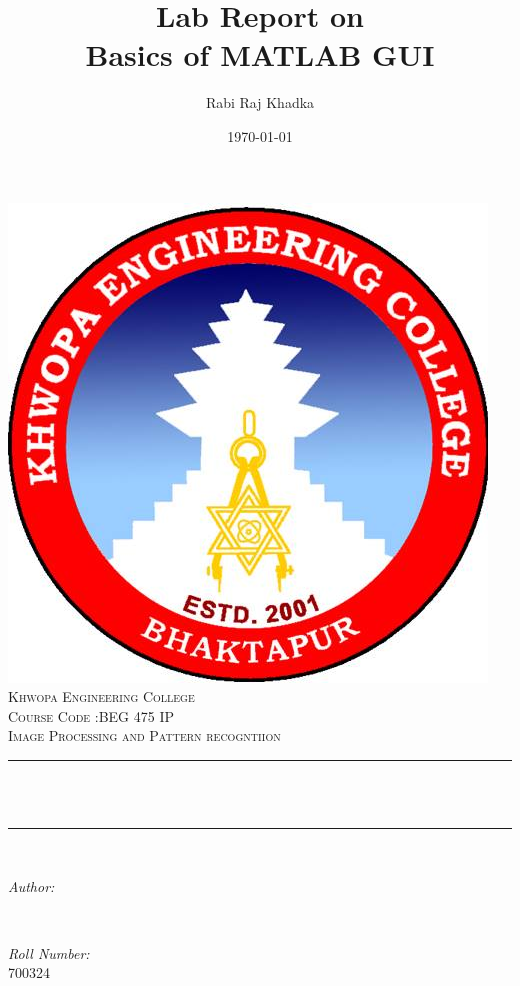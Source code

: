 \documentclass[12pt]{article}
\title{Lab Report on \\ Basics of MATLAB GUI}			%
\author{Rabi Raj Khadka}								%
\date{\today}											%
\makeatletter
\let\thetitle\@title
\let\theauthor\@author
\let\thedate\@date
\makeatother
\begin{document}

\begin{titlepage}
	\centering
    \includegraphics[scale = 0.3]{kheclogo.jpg}\\[1.0 cm]	%
    \textsc{\LARGE Khwopa Engineering College}\\[2.0 cm]	%
	\textsc{\Large Course Code :BEG 475 IP}\\[0.5 cm]				%
	\textsc{\large Image Processing and Pattern recogntiion}\\[0.5 cm]				%
	\rule{\linewidth}{0.2 mm} \\[0.4 cm]
	{ \huge \bfseries \thetitle}\\
	\rule{\linewidth}{0.2 mm} \\[3.0 cm]	
	\begin{minipage}{0.4\textwidth}
		\begin{flushleft} \large
			\emph{Author:}\\
			\theauthor
			\end{flushleft}
			\end{minipage}~
			\begin{minipage}{0.4\textwidth}
			\begin{flushright} \large
			\emph{Roll  Number:} \\
			700324									%
		\end{flushright}
	\end{minipage}\\[2 cm]
	
	{\large \thedate}\\[2 cm]
 
	\vfill
	
\end{titlepage}
\end{document}
